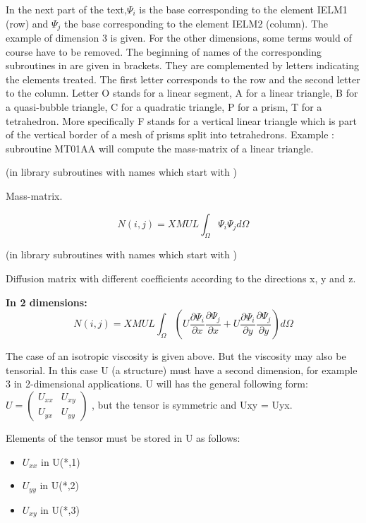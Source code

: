 In the next part of the text,$\Psi _{i} $ is the base corresponding to the
element IELM1 (row) and $\Psi _{j} $ the base corresponding to the element
IELM2 (column). The example of dimension 3 is given. For the other dimensions,
some terms would of course have to be removed. The beginning of names of the
corresponding subroutines in \bief are given in brackets. They are complemented
by letters indicating the elements treated. The first letter corresponds to the
row and the second letter to the column. Letter O stands for a linear segment,
A for a linear triangle, B for a quasi-bubble triangle, C for a quadratic
triangle, P for a prism, T for a tetrahedron. More specifically F stands for a
vertical linear triangle which is part of the vertical border of a mesh of
prisms split into tetrahedrons. Example : subroutine MT01AA will compute the
mass-matrix of a linear triangle.


(in library \bief subroutines with names which start with )

Mass-matrix.

\[N(i,j)=XMUL \int _{\Omega }\Psi _{i} \Psi _{j} d\Omega  \]


(in library \bief subroutines with names which start with )

Diffusion matrix with different coefficients according to the directions x, y
and z.

\textbf{In 2 dimensions:}
\[N(i,j)=XMUL \int _{\Omega }
(U\frac{\partial \Psi _{i} }{\partial x}
  \frac{\partial \Psi _{j} }{\partial x}
 +U\frac{\partial \Psi _{i} }{\partial y}
   \frac{\partial \Psi _{j} }{\partial y} )d\Omega  \]

The case of an isotropic viscosity is given above. But the viscosity may also
be tensorial. In this case U (a structure) must have a second
dimension, for example 3 in 2-dimensional applications. U will has the general
following form:
$U=\left(\begin{array}{cc}
    {U_{xx} } & {U_{xy} } \\
    {U_{yx} } & {U_{yy} }
\end{array}\right)$
, but the tensor is symmetric and Uxy = Uyx.

Elements of the tensor must be stored in U as follows:
\begin{itemize}
  \item $U_{xx}$ in U(*,1)
  \item $U_{yy}$ in U(*,2)
  \item $U_{xy}$ in U(*,3)
\end{itemize}

